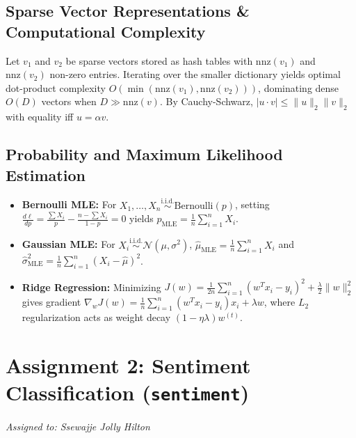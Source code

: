 \documentclass[11pt,a4paper]{article}
\begin{document}
\subsection{Sparse Vector Representations \& Computational Complexity}
Let $v_1$ and $v_2$ be sparse vectors stored as hash tables with $\text{nnz}(v_1)$ and $\text{nnz}(v_2)$ non-zero entries. Iterating over the smaller dictionary yields optimal dot-product complexity $O(\min(\text{nnz}(v_1), \text{nnz}(v_2)))$, dominating dense $O(D)$ vectors when $D \gg \text{nnz}(v)$. By Cauchy-Schwarz, $|u \cdot v| \le \|u\|_2 \|v\|_2$ with equality iff $u = \alpha v$.

\subsection{Probability and Maximum Likelihood Estimation}
\begin{itemize}
    \item \textbf{Bernoulli MLE:} For $X_1, \dots, X_n \overset{\text{i.i.d.}}{\sim} \text{Bernoulli}(p)$, setting $\frac{d\ell}{dp} = \frac{\sum X_i}{p} - \frac{n - \sum X_i}{1-p} = 0$ yields $\hat{p}_{\text{MLE}} = \frac{1}{n}\sum_{i=1}^n X_i$.
    \item \textbf{Gaussian MLE:} For $X_i \overset{\text{i.i.d.}}{\sim} \mathcal{N}(\mu, \sigma^2)$, $\hat{\mu}_{\text{MLE}} = \frac{1}{n}\sum_{i=1}^n X_i$ and $\hat{\sigma}^2_{\text{MLE}} = \frac{1}{n}\sum_{i=1}^n (X_i - \hat{\mu})^2$.
    \item \textbf{Ridge Regression:} Minimizing $J(w) = \frac{1}{2n}\sum_{i=1}^n (w^T x_i - y_i)^2 + \frac{\lambda}{2}\|w\|_2^2$ gives gradient $\nabla_w J(w) = \frac{1}{n}\sum_{i=1}^n (w^T x_i - y_i)x_i + \lambda w$, where $L_2$ regularization acts as weight decay $(1 - \eta\lambda)w^{(t)}$.
\end{itemize}

\section{Assignment 2: Sentiment Classification (\texttt{sentiment})}
\textit{Assigned to: Ssewajje Jolly Hilton}
\end{document}
